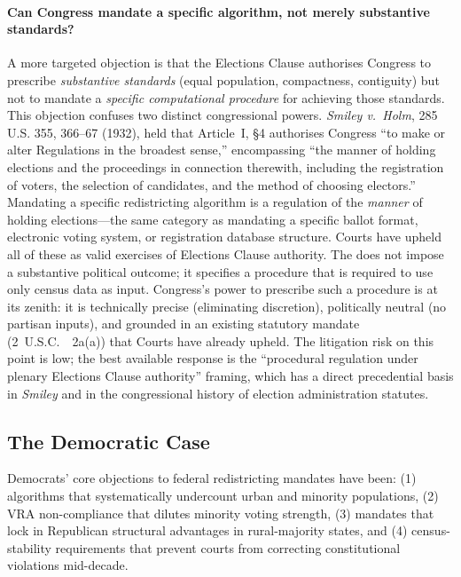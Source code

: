 \paragraph{Can Congress mandate a specific algorithm, not merely substantive standards?}
A more targeted objection is that the Elections Clause authorises Congress to
prescribe \emph{substantive standards} (equal population, compactness, contiguity)
but not to mandate a \emph{specific computational procedure} for achieving those standards.
This objection confuses two distinct congressional powers.
\textit{Smiley v.\ Holm}, 285 U.S. 355, 366--67 (1932), held that Article~I, \S4
authorises Congress ``to make or alter Regulations in the broadest sense,''
encompassing ``the manner of holding elections and the proceedings in connection
therewith, including the registration of voters, the selection of candidates, and
the method of choosing electors.''
Mandating a specific redistricting algorithm is a regulation of the \emph{manner}
of holding elections---the same category as mandating a specific ballot format,
electronic voting system, or registration database structure.
Courts have upheld all of these as valid exercises of Elections Clause authority.
The \dia{} does not impose a substantive political outcome; it specifies a
procedure that is required to use only census data as input.
Congress's power to prescribe such a procedure is at its zenith: it is technically
precise (eliminating discretion), politically neutral (no partisan inputs), and
grounded in an existing statutory mandate (2~U.S.C.~\usca{}~2a(a)) that Courts have
already upheld.
The litigation risk on this point is low; the best available response is the
``procedural regulation under plenary Elections Clause authority'' framing, which
has a direct precedential basis in \textit{Smiley} and in the congressional history
of election administration statutes.

\subsection{The Democratic Case}

Democrats' core objections to federal redistricting mandates have been:
(1) algorithms that systematically undercount urban and minority populations,
(2) VRA non-compliance that dilutes minority voting strength, (3) mandates
that lock in Republican structural advantages in rural-majority states,
and (4) census-stability requirements that prevent courts from correcting
constitutional violations mid-decade.

